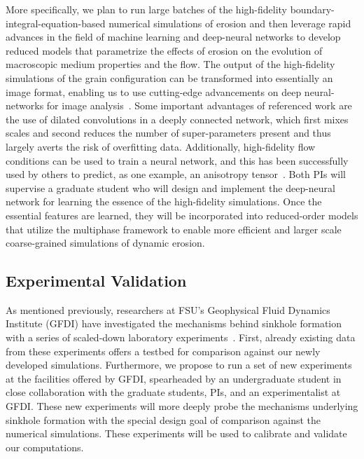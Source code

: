 \documentclass[11pt]{article}
\begin{document}
More specifically, we plan to run large batches of the high-fidelity boundary-integral-equation-based numerical simulations of erosion and then leverage rapid advances in the field of machine learning and deep-neural networks to develop reduced models that parametrize the effects of erosion on the evolution of macroscopic medium properties and the flow.  The output of the high-fidelity simulations of the grain configuration can be transformed into essentially an image format, enabling us to use cutting-edge advancements on deep neural-networks for image analysis~\cite{pelt2018mixed}. Some important advantages of referenced work are the use of dilated convolutions in a deeply connected network, which first mixes scales and second reduces the number of super-parameters present and thus largely averts the risk of overfitting data. Additionally, high-fidelity flow conditions can be used to train a neural network, and this has been successfully used by others to predict, as one example, an anisotropy tensor~\cite{ling2016reynolds}.  Both PIs will supervise a graduate student who will design and implement the deep-neural network for learning the essence of the high-fidelity simulations. Once the essential features are learned, they will be incorporated into reduced-order models that utilize the multiphase framework to enable more efficient and larger scale coarse-grained simulations of dynamic erosion.

\subsection{Experimental Validation}
\label{sec:experiments}
As mentioned previously, researchers at FSU's Geophysical Fluid Dynamics Institute (GFDI) have investigated the mechanisms behind sinkhole formation with a series of scaled-down laboratory experiments~\cite{tao2014experimental}. First, already existing data from these experiments offers a testbed for comparison against our newly developed simulations. Furthermore, we propose to run a set of new experiments at the facilities offered by GFDI, spearheaded by an undergraduate student in close collaboration with the graduate students, PIs, and an experimentalist at GFDI. These new experiments will more deeply probe the mechanisms underlying sinkhole formation with the special design goal of comparison against the numerical simulations. These experiments will be used to calibrate and validate our computations.
\end{document}
